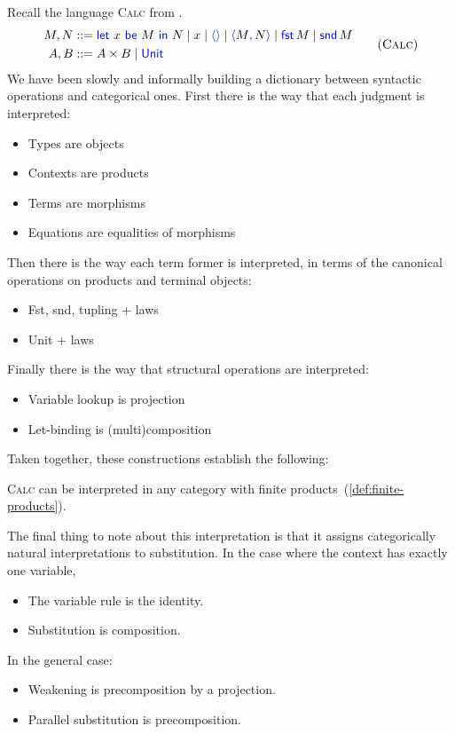 Recall the language \textsc{Calc} from .
\begin{gather}
  \begin{aligned}
  M,N &::= \pllet{x}{M}{N} \mid x \mid \plunit{} \mid \plpair{M}{N} \mid \plfst{M} \mid \plsnd{M} \\
  A,B &::= A \times B \mid \plUnit
  \end{aligned}
  \tag{\textsc{Calc}}
  \label{lang:calc}
\end{gather}
We have been slowly and informally building a dictionary between
syntactic operations and categorical ones.
First there is the way that each judgment is interpreted:
\begin{itemize}
\item Types are objects
\item Contexts are products
\item Terms are morphisms
\item Equations are equalities of morphisms
\end{itemize}
Then there is the way each term former is interpreted,
in terms of the canonical operations on products and terminal objects:
\begin{itemize}
\item Fst, snd, tupling + laws
\item Unit + laws
\end{itemize}
Finally there is the way that structural operations are interpreted:
\begin{itemize}
\item Variable lookup is projection
\item Let-binding is (multi)composition
\end{itemize}
Taken together, these constructions establish the following:
\begin{theorem} \label{thm:calc-products}
  \textsc{Calc} can be interpreted in any category with finite products~(\cref{def:finite-products}).
\end{theorem}
The final thing to note about this interpretation is that it assigns categorically natural interpretations
to substitution. In the case where the context has exactly one variable,
\begin{itemize}
\item The variable rule is the identity.
\item Substitution is composition.
\end{itemize}
In the general case:
\begin{itemize}
\item Weakening is precomposition by a projection.
\item Parallel substitution is precomposition.
\end{itemize}

